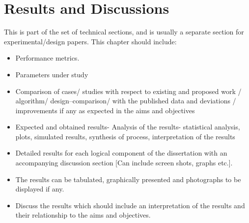 \chapter{Results and Discussions}
This is part of the set of technical sections, and is usually a separate section for experimental/design papers.  This chapter should include:

\begin{itemize}
	\item Performance metrics.
	\item Parameters under study 
	\item Comparison of cases/ studies with respect to existing and proposed work / algorithm/ design–comparison/ with the published data and deviations / improvements if any as expected in the aims and objectives
	\item Expected and obtained results- Analysis of the results- statistical analysis, plots, simulated results, synthesis of process, interpretation of the results 
	\item Detailed results for each logical component of the dissertation with an accompanying discussion section [Can include screen shots, graphs etc.].
	\item The results can be tabulated, graphically presented and photographs to be displayed if any.
	\item Discuss the results which should include an interpretation of the results and their relationship to the aims and objectives.
\end{itemize}